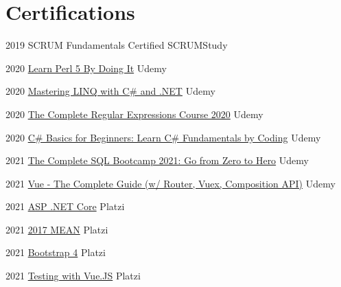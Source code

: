\documentclass[letterpaper]{twentysecondcv} %
\begin{document}
\section{Certifications}
{
    \begin{twenty}
        
        \twentyitem
        {2019}
        {SCRUM Fundamentals Certified}
        {SCRUMStudy}
        {}
        
        \twentyitem
        {2020}
        {\href{http://ude.my/UC-8b854042-ac78-4c5b-a412-65ba63899017}
            {Learn Perl 5 By Doing It}
        }
        {Udemy}
        {}
    
        
        
        \twentyitem
        {2020}
        {\href{http://ude.my/UC-cdbb0eb7-1152-42f4-883d-d267f2b7adf7}
            {Mastering LINQ with C\# and .NET}
        }
        {Udemy}
        {}
    
        \twentyitem
        {2020}
        {\href{http://ude.my/UC-c10e41d9-1c6f-44e5-9426-d4c40e385673}
            {The Complete Regular Expressions Course 2020}
        }
        {Udemy}
        {}
        
        \twentyitem
        {2020}
        {\href{http://ude.my/UC-d913aaf2-7f89-43bf-ab2d-a6d0192fd784}
            {C\# Basics for Beginners: Learn C\# Fundamentals by Coding}
        }
        {Udemy}
        {}
        
        \twentyitem
        {2021}
        {\href{http://ude.my/UC-a276cfba-5873-4f08-892b-ecd564b69cc7}
            {The Complete SQL Bootcamp 2021: Go from Zero to Hero}
        }
        {Udemy}
        {}
        
        \twentyitem
        {2021}
        {\href{http://ude.my/UC-6739b136-b8be-4568-ad89-7fd19bc0096d}
            {Vue - The Complete Guide (w/ Router, Vuex, Composition API)}}
        {Udemy}
        {}
        
        \twentyitem
        {2021}
        {\href{https://platzi.com/p/camurillo582/curso/1395-course/diploma/detalle}
            {ASP .NET Core}
        }
        {Platzi}
        {}
        
        \twentyitem
        {2021}
        {\href{https://platzi.com/p/camurillo582/curso/1182-mean-2017/diploma/detalle/}
            {2017 MEAN}
        }
        {Platzi}
        {}
        
        \twentyitem
        {2021}
        {\href{https://platzi.com/p/camurillo582/curso/1331-bootstrap/diploma/detalle/}
            {Bootstrap 4}
        }
        {Platzi}
        {}
        
        \twentyitem
        {2021}
        {\href{https://platzi.com/p/camurillo582/curso/1950-course/diploma/detalle/}
            {Testing with Vue.JS}
        }
        {Platzi}
        {}

\end{twenty}
}


 \restoregeometry
\end{document}
